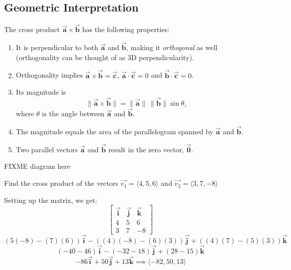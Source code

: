 \subsection{Geometric Interpretation}
The cross product $\vec{\mathbf{a}} \times \vec{\mathbf{b}}$ has the following properties:
\begin{enumerate}
    \item It is perpendicular to both $\vec{\mathbf{a}}$ and $\vec{\mathbf{b}}$, making it \emph{orthogonal} as well (orthogonality can be thought of as 3D perpendicularity).
    \item Orthogonality implies $\vec{\mathbf{a}} \times \vec{\mathbf{b}} = \vec{\mathbf{c}}$, $\vec{\mathbf{a}} \cdot \vec{\mathbf{c}} = 0$ and $\vec{\mathbf{b}} \cdot \vec{\mathbf{c}} = 0$. 
    \item Its magnitude is
    \[
    \|\vec{\mathbf{a}} \times \vec{\mathbf{b}}\| = \|\vec{\mathbf{a}}\|\,\|\vec{\mathbf{b}}\| \sin\theta,
    \]
    where $\theta$ is the angle between $\vec{\mathbf{a}}$ and $\vec{\mathbf{b}}$.
    \item The magnitude equals the area of the parallelogram spanned by $\vec{\mathbf{a}}$ and $\vec{\mathbf{b}}$.
    \item Two parallel vectors $\vec{\mathbf{a}}$ and $\vec{\mathbf{b}}$ result in the zero vector, $\vec{\mathbf{0}}$. 
\end{enumerate}

FIXME diagram here

\begin{Exercise}[title = {Using the cross product}, label = cross1]
Find the cross product of the vectors $\vec{v_1} = \langle4, 5, 6\rangle$ and $\vec{v_2} = \langle3, 7, -8\rangle$ 
\end{Exercise}

\begin{Answer}[ref = cross1]
Setting up the matrix, we get:
\[\begin{bmatrix}

    \vec{\mathbf{i}} & \vec{\mathbf{j}} & \vec{\mathbf{k}} \\ 
    4 & 5 & 6 \\ 
    3 & 7 & -8 
    
\end{bmatrix}
\]
\[\left(5(-8) - (7)(6)\right)\vec{\mathbf{i}} - ((4)(-8) - (6)(3))\vec{\mathbf{j}} + ((4)(7)-(5)(3))\vec{\mathbf{k}}
\]
\[
(-40 - 46 ) \vec{\mathbf{i}} - (-32 - 18)\vec{\mathbf{j}} + (28 - 15) \vec{\mathbf{k}}
\]
\[
-86 \vec{\mathbf{i}} +50\vec{\mathbf{j}} + 13 \vec{\mathbf{k}} \implies \langle-82, 50, 13\rangle
\]
\end{Answer}
